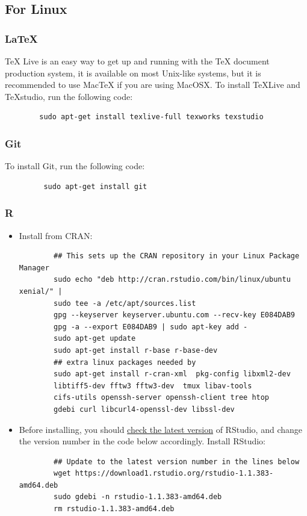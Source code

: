 \documentclass[11pt]{article} %
\begin{document}
  \subsection{For Linux}
  
    \subsubsection{LaTeX}
    TeX Live is an easy way to get up and running with the TeX document production system, it is available on most Unix-like systems, but it is recommended to use MacTeX if you are using MacOSX. 
    To install TeXLive and TeXstudio, run the following code:
    	\begin{lstlisting}
    	sudo apt-get install texlive-full texworks texstudio
    	\end{lstlisting}
    \subsubsection{Git}
    To install Git, run the following code:
    	\begin{lstlisting}
    	 sudo apt-get install git
    	\end{lstlisting}
    \subsubsection{R}
    
    \begin{itemize}
    	\item Install from CRAN:
    	\begin{lstlisting}
    	## This sets up the CRAN repository in your Linux Package Manager
    	sudo echo "deb http://cran.rstudio.com/bin/linux/ubuntu xenial/" | 
    	sudo tee -a /etc/apt/sources.list
    	gpg --keyserver keyserver.ubuntu.com --recv-key E084DAB9
    	gpg -a --export E084DAB9 | sudo apt-key add -
    	sudo apt-get update
    	sudo apt-get install r-base r-base-dev
    	## extra linux packages needed by
    	sudo apt-get install r-cran-xml  pkg-config libxml2-dev
    	libtiff5-dev fftw3 fftw3-dev  tmux libav-tools
    	cifs-utils openssh-server openssh-client tree htop
    	gdebi curl libcurl4-openssl-dev libssl-dev
    	\end{lstlisting}
    	\item Before installing, you should \href{https://www.rstudio.com/products/rstudio/download/}{check the latest version} of RStudio, and change the version number in the code below accordingly. 
      Install RStudio:
    	\begin{lstlisting} 
    	## Update to the latest version number in the lines below
    	wget https://download1.rstudio.org/rstudio-1.1.383-amd64.deb
    	sudo gdebi -n rstudio-1.1.383-amd64.deb
    	rm rstudio-1.1.383-amd64.deb
    	\end{lstlisting}
    
    \end{itemize}
  
\end{document}
